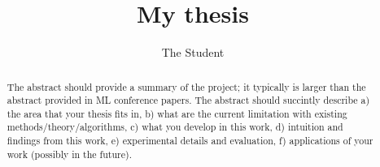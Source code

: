 \documentclass[a4paper,11pt,oneside]{mythesis}
\title{My thesis}
\author{The Student} %
\begin{document}
\frontmatter
{}
\titlepage


\begin{abstract}
The abstract should provide a summary of the project; it typically is larger than the abstract provided in ML conference papers. The abstract should succintly describe a) the area that your thesis fits in, b) what are the current limitation with existing methods/theory/algorithms, c) what you develop in this work, d) intuition and findings from this work, e) experimental details and evaluation, f) applications of your work (possibly in the future). 
\end{abstract}
\clearpage

 \clearpage
\tableofcontents* \clearpage

\mainmatter
\pagestyle{TUDelft}
\clearpage
\clearpage
\clearpage
\clearpage
\clearpage

\cleardoublepage


\end{document}
